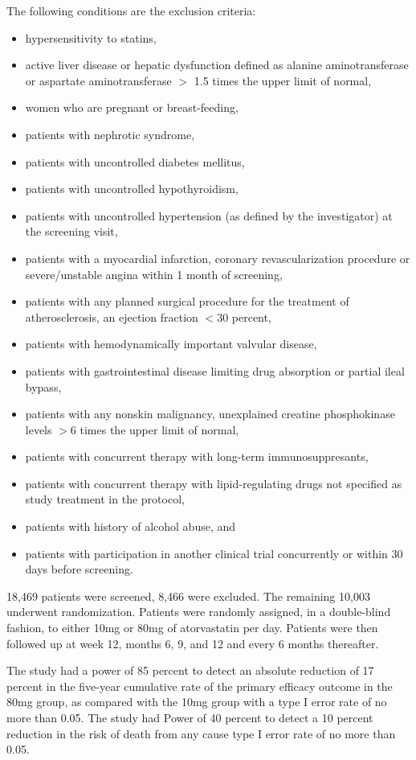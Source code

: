 \documentclass[11pt,a4paper]{article}
\begin{document}
The following conditions are the exclusion criteria: 
\begin{itemize}
\item hypersensitivity to statins, 
\item active liver disease or hepatic dysfunction defined as alanine aminotransferase or aspartate aminotransferase $>$ 1.5 times the upper limit of normal, 
\item women who are pregnant or breast-feeding, 
\item patients with nephrotic syndrome, 
\item patients with uncontrolled diabetes mellitus, 
\item patients with uncontrolled hypothyroidism, 
\item patients with uncontrolled hypertension (as defined by the investigator) at the screening visit, 
\item patients with a myocardial infarction, coronary revascularization procedure or severe/unstable angina within 1 month of screening, 
\item patients with any planned surgical procedure for the treatment of atherosclerosis, an ejection fraction $< 30$ percent, 
\item patients with hemodynamically important valvular disease, 
\item patients with gastrointestinal disease limiting drug absorption or partial ileal bypass, 
\item patients with any nonskin malignancy, unexplained creatine phosphokinase levels $> 6$ times the upper limit of normal, 
\item patients with concurrent therapy with long-term immunosuppresants, 
\item patients with concurrent therapy with lipid-regulating drugs not specified as study treatment in the protocol, 
\item patients with history of alcohol abuse, and 
\item patients with participation in another clinical trial concurrently or within 30 days before screening. 
\end{itemize}

18,469 patients were screened, 8,466 were excluded. The remaining 10,003 underwent randomization. Patients were randomly assigned, in a double-blind fashion, to either 10mg or 80mg of atorvastatin per day.  Patients were then followed up at week 12, months 6, 9, and 12 and every 6 months thereafter. 

The study had a power of 85 percent to detect an absolute reduction of 17 percent in the five-year cumulative rate of the primary efficacy outcome in the 80mg group, as compared with the 10mg group with a type I error rate of no more than 0.05. The study had Power of 40 percent to detect a 10 percent reduction in the risk of death from any cause type I error rate of no more than 0.05. 
\end{document}
